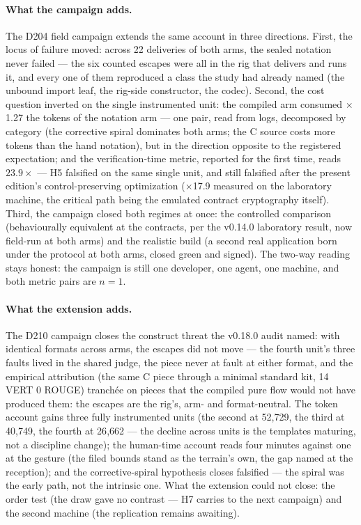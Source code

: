 \documentclass[11pt,a4paper]{article}
\begin{document}
\paragraph{What the campaign adds.}
The D204 field campaign extends the same account in three directions.
First, the locus of failure moved: across 22 deliveries of both arms,
the sealed notation never failed --- the six counted escapes were all
in the rig that delivers and runs it, and every one of them reproduced
a class the study had already named (the unbound import leaf, the
rig-side constructor, the codec). Second, the cost question inverted
on the single instrumented unit: the compiled arm consumed
$\times$1.27 the tokens of the notation arm --- one pair, read from
logs, decomposed by category (the corrective spiral dominates both
arms; the C source costs more tokens than the hand notation), but in
the direction opposite to the registered expectation;
and the verification-time metric, reported for the first time, reads
$23.9\times$ --- H5 falsified on the same single unit, and still
falsified after the present edition's control-preserving optimization
($\times$17.9 measured on the laboratory machine, the critical path
being the emulated contract cryptography itself). Third, the
campaign closed both regimes at once: the controlled comparison
(behaviourally equivalent at the contracts, per the v0.14.0
laboratory result, now field-run at both arms) and the realistic
build (a second real application born under the protocol at both
arms, closed green and signed). The two-way reading stays honest: the
campaign is still one developer, one agent, one machine, and both
metric pairs are $n{=}1$.

\paragraph{What the extension adds.} The D210 campaign closes the
construct threat the v0.18.0 audit named: with identical formats
across arms, the escapes did not move --- the fourth unit's three
faults lived in the shared judge, the piece never at fault at either
format, and the empirical attribution (the same C piece through a
minimal standard kit, 14 VERT 0 ROUGE) tranch\'ee on pieces that the
compiled pure flow would not have produced them: the escapes are the
rig's, arm- and format-neutral. The token account gains three fully
instrumented units (the second at 52{,}729, the third at 40{,}749,
the fourth at 26{,}662 --- the decline across units is the templates
maturing, not a discipline change); the human-time account reads
four minutes against one at the gesture (the filed bounds stand as
the terrain's own, the gap named at the reception); and the
corrective-spiral hypothesis closes falsified --- the spiral was the
early path, not the intrinsic one. What the extension could not
close: the order test (the draw gave no contrast --- H7 carries to
the next campaign) and the second machine (the replication remains
awaiting).
\end{document}
